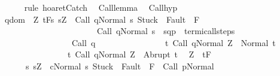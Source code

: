\begin{isabellebody}
\ \ \ \ \isamarkupfalse%
\ {\isacharparenleft}rule\ hoaret{\isachardot}Catch\ {\isacharparenright}\isanewline
{}\isamarkupfalse%
%
\endisatagproof
{\isafoldproof}%
%
\isadelimproof
\isanewline
%
\endisadelimproof
\isanewline
\isanewline
{}\isamarkupfalse%
\ Call{\isacharunderscore}lemma{\isacharprime}{\isacharcolon}\isanewline
\ \ Call{\isacharunderscore}hyp{\isacharcolon}\ \isanewline
\ {\isachardoublequoteopen}{\isasymforall}q{\isasymin}dom\ {\isasymGamma}{\isachardot}\ {\isasymforall}Z{\isachardot}\ {\isasymGamma}{\isacharcomma}{\isasymTheta}{\isasymturnstile}\isactrlsub t\isactrlbsub {\isacharslash}F\isactrlesub {\isacharbraceleft}s{\isachardot}\ s{\isacharequal}Z\ {\isasymand}\ {\isasymGamma}{\isasymturnstile}{\isasymlangle}Call\ q{\isacharcomma}Normal\ s{\isasymrangle}\ {\isasymRightarrow}{\isasymnotin}{\isacharparenleft}{\isacharbraceleft}Stuck{\isacharbraceright}\ {\isasymunion}\ Fault\ {\isacharbackquote}\ {\isacharparenleft}{\isacharminus}F{\isacharparenright}{\isacharparenright}\ {\isasymand}\isanewline
\ \ \ \ \ \ \ \ \ \ \ \ \ \ \ \ \ \ \ \ \ \ \ {\isasymGamma}{\isasymturnstile}Call\ q{\isasymdown}Normal\ s\ {\isasymand}\ {\isacharparenleft}{\isacharparenleft}s{\isacharcomma}q{\isacharparenright}{\isacharcomma}{\isacharparenleft}{\isasymsigma}{\isacharcomma}p{\isacharparenright}{\isacharparenright}\ {\isasymin}\ termi{\isacharunderscore}call{\isacharunderscore}steps\ {\isasymGamma}{\isacharbraceright}\isanewline
\ \ \ \ \ \ \ \ \ \ \ \ \ \ \ \ \ {\isacharparenleft}Call\ q{\isacharparenright}\isanewline
\ \ \ \ \ \ \ \ \ \ \ \ \ \ \ \ {\isacharbraceleft}t{\isachardot}\ {\isasymGamma}{\isasymturnstile}{\isasymlangle}Call\ q{\isacharcomma}Normal\ Z{\isasymrangle}\ {\isasymRightarrow}\ Normal\ t{\isacharbraceright}{\isacharcomma}\isanewline
\ \ \ \ \ \ \ \ \ \ \ \ \ \ \ \ {\isacharbraceleft}t{\isachardot}\ {\isasymGamma}{\isasymturnstile}{\isasymlangle}Call\ q{\isacharcomma}Normal\ Z{\isasymrangle}\ {\isasymRightarrow}\ Abrupt\ t{\isacharbraceright}{\isachardoublequoteclose}\isanewline
\ \ {\isachardoublequoteopen}{\isasymAnd}Z{\isachardot}\ {\isasymGamma}{\isacharcomma}{\isasymTheta}\ {\isasymturnstile}\isactrlsub t\isactrlbsub {\isacharslash}F\isactrlesub \ \ \isanewline
\ \ \ \ \ \ {\isacharbraceleft}s{\isachardot}\ s{\isacharequal}Z\ {\isasymand}\ {\isasymGamma}{\isasymturnstile}{\isasymlangle}c{\isacharcomma}Normal\ s{\isasymrangle}\ {\isasymRightarrow}{\isasymnotin}{\isacharparenleft}{\isacharbraceleft}Stuck{\isacharbraceright}\ {\isasymunion}\ Fault\ {\isacharbackquote}\ {\isacharparenleft}{\isacharminus}F{\isacharparenright}{\isacharparenright}\ {\isasymand}\ {\isasymGamma}{\isasymturnstile}Call\ p{\isasymdown}Normal\ {\isasymsigma}\ {\isasymand}\ \isanewline

\end{isabellebody}
